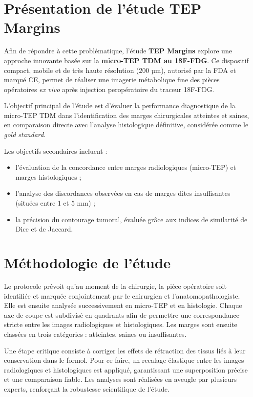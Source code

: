 \documentclass[12pt,a4paper]{report}
\begin{document}
\section{Présentation de l'étude TEP Margins}

Afin de répondre à cette problématique, l'étude \textbf{TEP Margins} explore une approche innovante basée sur la \textbf{micro-TEP TDM au 18F-FDG}. Ce dispositif compact, mobile et de très haute résolution (200 µm), autorisé par la FDA et marqué CE, permet de réaliser une imagerie métabolique fine des pièces opératoires \textit{ex vivo} après injection peropératoire du traceur 18F-FDG.

L'objectif principal de l'étude est d'évaluer la performance diagnostique de la micro-TEP TDM dans l'identification des marges chirurgicales atteintes et saines, en comparaison directe avec l'analyse histologique définitive, considérée comme le \textit{gold standard}.

Les objectifs secondaires incluent :
\begin{itemize}
\item l'évaluation de la concordance entre marges radiologiques (micro-TEP) et marges histologiques ;
\item l'analyse des discordances observées en cas de marges dites insuffisantes (situées entre 1 et 5 mm) ;
\item la précision du contourage tumoral, évaluée grâce aux indices de similarité de Dice et de Jaccard.
\end{itemize}

\section{Méthodologie de l'étude}

Le protocole prévoit qu'au moment de la chirurgie, la pièce opératoire soit identifiée et marquée conjointement par le chirurgien et l'anatomopathologiste. Elle est ensuite analysée successivement en micro-TEP et en histologie. Chaque axe de coupe est subdivisé en quadrants afin de permettre une correspondance stricte entre les images radiologiques et histologiques. Les marges sont ensuite classées en trois catégories : atteintes, saines ou insuffisantes.

Une étape critique consiste à corriger les effets de rétraction des tissus liés à leur conservation dans le formol. Pour ce faire, un recalage élastique entre les images radiologiques et histologiques est appliqué, garantissant une superposition précise et une comparaison fiable. Les analyses sont réalisées en aveugle par plusieurs experts, renforçant la robustesse scientifique de l'étude.
\end{document}
